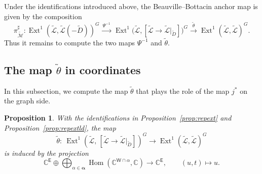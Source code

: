 \documentclass[dvipsnames,11pt]{article}
\newtheorem{proposition}[theorem]{Proposition}
\theoremstyle{definition}
\newcommand{\C}{{\mathbb C}}
\def\W{\mathsf W}
\def\E{\mathsf E}
\def\zz{\bm \alpha}
\def\Ext{\operatorname{Ext}}
\def\Ext{\operatorname{Ext}}
\DeclareMathOperator{\Hom}{Hom}
\begin{document}
Under the identifications introduced above, the Beauville--Bottacin anchor map is given by the composition
\[
\pi^\sharp_{\widetilde{\mathcal M}}:
\Ext^1(\widetilde{\mathcal L},\widetilde{\mathcal L}(-\widetilde D))^{G}
\xrightarrow{\ \Psi^{-1}\ }
\Ext^1\!\bigl(\widetilde{\mathcal L},
[\widetilde{\mathcal L}\to \widetilde{\mathcal L}|_{\widetilde D}]\bigr)^G
\xrightarrow{\ \widetilde\theta\ }
\Ext^1(\widetilde{\mathcal L},\widetilde{\mathcal L})^{G}.
\]
Thus it remains to compute the two maps \(\Psi^{-1}\) and \(\widetilde\theta\).

\subsection{The map \texorpdfstring{$\widetilde\theta$}{theta} in coordinates}

In this subsection, we compute the map $\widetilde \theta$ that plays the role of the map \(j^*\) on the graph side.

\begin{proposition}\label{prop:extlldtoextld}
With the identifications in Proposition~\ref{prop:repext} and Proposition~\ref{prop:repextld}, the map
\[
\widetilde \theta:\ \Ext^1(\widetilde{\mathcal L},\,[\widetilde{\mathcal L}\to \widetilde{\mathcal L}|_{\widetilde D}])^G
\rightarrow \Ext^1(\widetilde{\mathcal L},\widetilde{\mathcal L})^G
\]
is induced by the projection
\[
\C^{\E}\oplus \bigoplus_{\alpha\in \zz}\Hom(\C^{\W\cap \alpha},\C)\rightarrow \C^{\E},
\qquad
(u,t)\mapsto u.
\]
\end{proposition}
\end{document}
